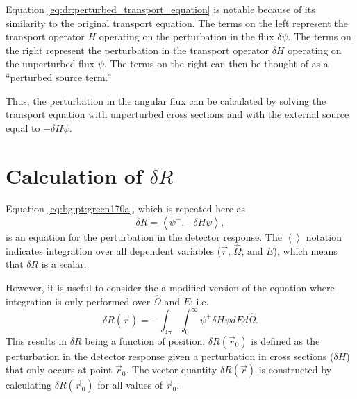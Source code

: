 Equation \ref{eq:dr:perturbed_transport_equation} is notable because of its similarity to the original transport equation.
The terms on the left represent the transport operator $H$ operating on the perturbation in the flux $\delta\psi$.
The terms on the right represent the perturbation in the transport operator $\delta H$ operating on the unperturbed flux $\psi$.
The terms on the right can then be thought of as a ``perturbed source term.''

Thus, the perturbation in the angular flux can be calculated by solving the transport equation with unperturbed cross sections and with the external source equal to $-\delta H\psi$.

\section{Calculation of $\delta R$}
\label{sec:dr:dr}

Equation \ref{eq:bg:pt:green170a}, which is repeated here as
\begin{equation*}
  \delta R = \left<\psi^+,-\delta H\psi\right>,
\end{equation*}
is an equation for the perturbation in the detector response.
The $\left<\right>$ notation indicates integration over all dependent variables ($\vec{r}$, $\hat{\Omega}$, and $E$), which means that $\delta R$ is a scalar.

However, it is useful to consider the a modified version of the equation where integration is only performed over $\hat{\Omega}$ and $E$; i.e.
\begin{equation}\label{eq:dr:dr_function_of_position}
  \delta R\left(\vec{r}\right) =
  -\int_{4\pi}\int_0^\infty\psi^+\delta H\psi dEd\hat{\Omega}.
\end{equation}
This results in $\delta R$ being a function of position.
$\delta R\left(\vec{r}_0\right)$ is defined as the perturbation in the detector response given a perturbation in cross sections ($\delta H$) that only occurs at point $\vec{r}_0$.
The vector quantity $\delta R\left(\vec{r}\right)$ is constructed by calculating $\delta R\left(\vec{r}_0\right)$ for all values of $\vec{r}_0$.

